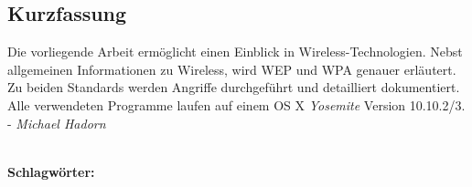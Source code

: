 
\subsection*{Kurzfassung}
Die vorliegende Arbeit ermöglicht einen Einblick in Wireless-Technologien.
Nebst allgemeinen Informationen zu Wireless, wird WEP und WPA genauer erläutert.
Zu beiden Standards werden Angriffe durchgeführt und detailliert dokumentiert.
Alle verwendeten Programme laufen auf einem OS X \textit{Yosemite} Version 10.10.2/3.
 - \textit{Michael Hadorn}


%
\mbox{}\\[0.5\baselineskip]\noindent
\textbf{Schlagwörter:} 
